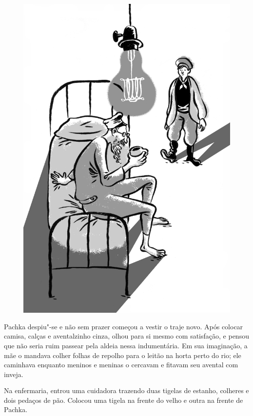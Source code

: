 \begin{figure}%
\vspace*{-2.2cm}
\hspace*{-2.5cm}\includegraphics{./imgs/cena7.jpg}
\end{figure}

Pachka despiu"-se e não sem prazer começou a vestir o traje novo. Após
colocar camisa, calças e aventalzinho cinza, olhou para si mesmo com
satisfação, e pensou que não seria ruim passear pela aldeia nessa
indumentária. Em sua imaginação, a mãe o mandava colher folhas de
repolho para o leitão na horta perto do rio; ele caminhava enquanto
meninos e meninas o cercavam e fitavam seu avental com inveja.

Na enfermaria, entrou uma cuidadora trazendo duas tigelas de estanho,
colheres e dois pedaços de pão. Colocou uma tigela na frente do velho e
outra na frente de Pachka.


